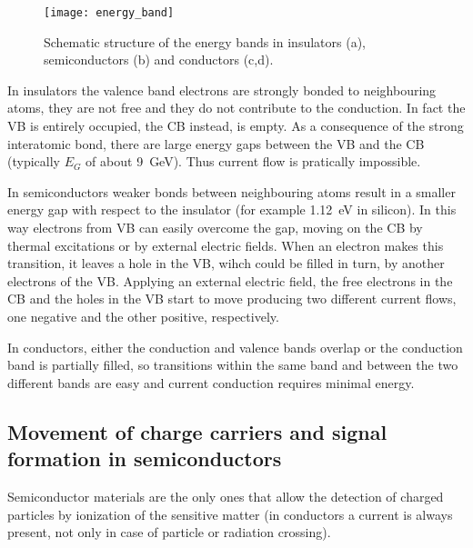 \begin{figure}[h!]
\centering
\texttt{[image: energy\_band]}
\caption{Schematic structure of the energy bands in insulators (a), semiconductors (b) and conductors (c,d).}
\label{fig:energy_band}
\end{figure}

In insulators the valence band electrons are strongly bonded to neighbouring atoms, they are not free and they do not contribute to the conduction. In fact the VB is entirely occupied, the CB instead, is empty. As a consequence of the strong interatomic bond, there are large energy gaps between the VB and the CB (typically $E_{G}$ of about \SI{9}{GeV}). Thus current flow is pratically impossible. 

In semiconductors weaker bonds between neighbouring atoms result in a smaller energy gap with respect to the insulator (for example \SI{1.12}{eV} in silicon). In this way electrons from VB can easily overcome the gap, moving on the CB by thermal excitations or by external electric fields. When an electron makes this transition, it leaves a hole in the VB, wihch could be filled in turn, by another electrons of the VB. Applying an external electric field, the free electrons in the CB and the holes in the VB start to move producing two different current flows, one negative and the other positive, respectively.

In conductors, either the conduction and valence bands overlap or the conduction band is partially filled, so transitions within the same band and between the two different bands are easy and current conduction requires minimal energy.


\subsection{Movement of charge carriers and signal formation in semiconductors}

Semiconductor materials are the only ones that allow the detection of charged particles by ionization of the sensitive matter (in conductors a current is always present, not only in case of particle or radiation crossing). 

